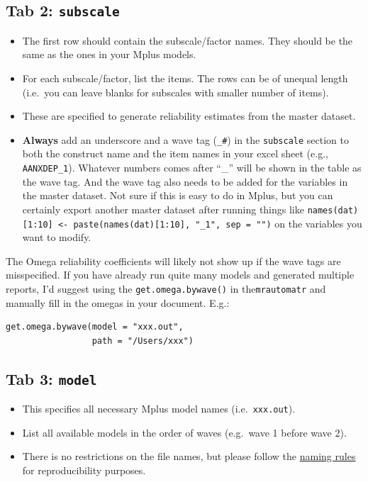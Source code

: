 \documentclass[
]{book}
\begin{document}
\hypertarget{tab-2-subscale}{%
\subsection{\texorpdfstring{Tab 2: \texttt{subscale}}{Tab 2: subscale}}\label{tab-2-subscale}}

\begin{itemize}
\item
  The first row should contain the subscale/factor names. They should be the same as the ones in your Mplus models.
\item
  For each subscale/factor, list the items. The rows can be of unequal length (i.e.~you can leave blanks for subscales with smaller number of items).
\item
  These are specified to generate reliability estimates from the master dataset.
\item
  \textbf{Always} add an underscore and a wave tag (\texttt{\_\#}) in the \texttt{subscale} section to both the construct name and the item names in your excel sheet (e.g., \texttt{AANXDEP\_1}). Whatever numbers comes after ``\_'' will be shown in the table as the wave tag. And the wave tag also needs to be added for the variables in the master dataset. Not sure if this is easy to do in Mplus, but you can certainly export another master dataset after running things like \texttt{names(dat){[}1:10{]}\ \textless{}-\ paste(names(dat){[}1:10{]},\ "\_1",\ sep\ =\ "")} on the variables you want to modify.
\end{itemize}

The Omega reliability coefficients will likely not show up if the wave tags are misspecified. If you have already run quite many models and generated multiple reports, I'd suggest using the \texttt{get.omega.bywave()} in the\texttt{mrautomatr} and manually fill in the omegas in your document. E.g.:

\begin{verbatim}
get.omega.bywave(model = "xxx.out", 
                 path = "/Users/xxx")
\end{verbatim}

\hypertarget{tab-3-model}{%
\subsection{\texorpdfstring{Tab 3: \texttt{model}}{Tab 3: model}}\label{tab-3-model}}

\begin{itemize}
\item
  This specifies all necessary Mplus model names (i.e.~\texttt{xxx.out}).
\item
  List all available models in the order of waves (e.g.~wave 1 before wave 2).
\item
  There is no restrictions on the file names, but please follow the \href{https://nyu.box.com/s/ate5l7wmw164u7xjg3g8x1vrfhwnt0ax}{naming rules} for reproducibility purposes.
\end{itemize}
\end{document}

